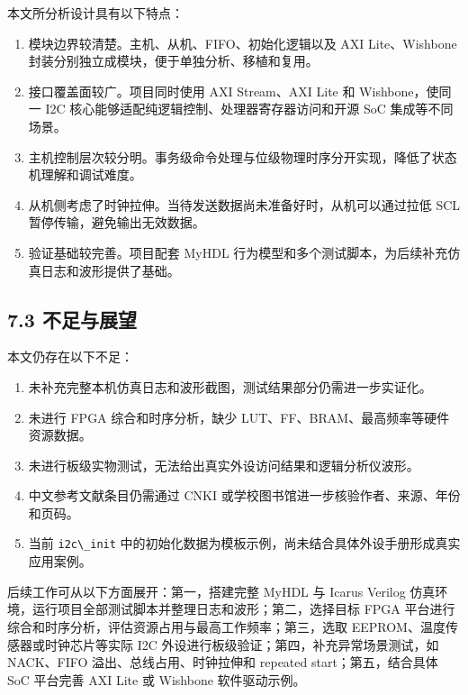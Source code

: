 本文所分析设计具有以下特点：

\begin{enumerate}
\def\labelenumi{\arabic{enumi}.}
\tightlist
\item
  模块边界较清楚。主机、从机、FIFO、初始化逻辑以及 AXI Lite、Wishbone
  封装分别独立成模块，便于单独分析、移植和复用。
\item
  接口覆盖面较广。项目同时使用 AXI Stream、AXI Lite 和 Wishbone，使同一
  I2C 核心能够适配纯逻辑控制、处理器寄存器访问和开源 SoC
  集成等不同场景。
\item
  主机控制层次较分明。事务级命令处理与位级物理时序分开实现，降低了状态机理解和调试难度。
\item
  从机侧考虑了时钟拉伸。当待发送数据尚未准备好时，从机可以通过拉低 SCL
  暂停传输，避免输出无效数据。
\item
  验证基础较完善。项目配套 MyHDL
  行为模型和多个测试脚本，为后续补充仿真日志和波形提供了基础。
\end{enumerate}

\subsection{7.3 不足与展望}\label{ux4e0dux8db3ux4e0eux5c55ux671b}

本文仍存在以下不足：

\begin{enumerate}
\def\labelenumi{\arabic{enumi}.}
\tightlist
\item
  未补充完整本机仿真日志和波形截图，测试结果部分仍需进一步实证化。
\item
  未进行 FPGA 综合和时序分析，缺少
  LUT、FF、BRAM、最高频率等硬件资源数据。
\item
  未进行板级实物测试，无法给出真实外设访问结果和逻辑分析仪波形。
\item
  中文参考文献条目仍需通过 CNKI
  或学校图书馆进一步核验作者、来源、年份和页码。
\item
  当前 \passthrough{\lstinline!i2c\_init!}
  中的初始化数据为模板示例，尚未结合具体外设手册形成真实应用案例。
\end{enumerate}

后续工作可从以下方面展开：第一，搭建完整 MyHDL 与 Icarus Verilog
仿真环境，运行项目全部测试脚本并整理日志和波形；第二，选择目标 FPGA
平台进行综合和时序分析，评估资源占用与最高工作频率；第三，选取
EEPROM、温度传感器或时钟芯片等实际 I2C
外设进行板级验证；第四，补充异常场景测试，如 NACK、FIFO
溢出、总线占用、时钟拉伸和 repeated start；第五，结合具体 SoC 平台完善
AXI Lite 或 Wishbone 软件驱动示例。
